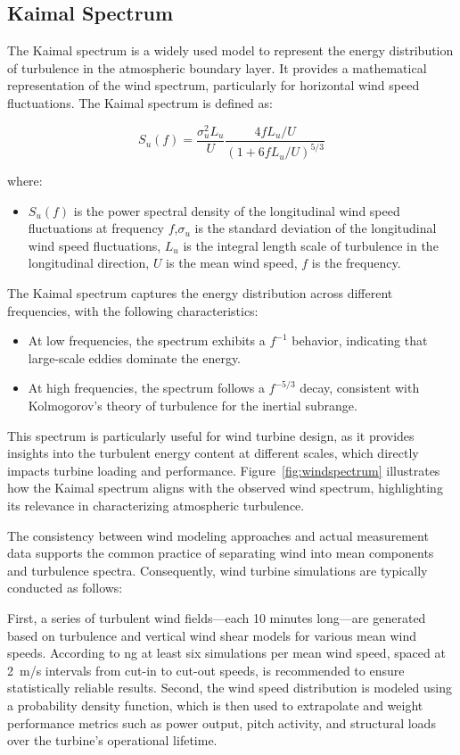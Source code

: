 \subsection{Kaimal Spectrum}
The Kaimal spectrum is a widely used model to represent the energy distribution of turbulence in the atmospheric boundary layer. It provides a mathematical representation of the wind spectrum, particularly for horizontal wind speed fluctuations. The Kaimal spectrum is defined as:

\begin{equation}
S_u(f) = \frac{\sigma_u^2 L_u}{U} \frac{4fL_u/U}{\left(1 + 6fL_u/U\right)^{5/3}}
\end{equation}

where:
\begin{itemize}
    \item $S_u(f)$ is the power spectral density of the longitudinal wind speed fluctuations at frequency $f$,$\sigma_u$ is the standard deviation of the longitudinal wind speed fluctuations, $L_u$ is the integral length scale of turbulence in the longitudinal direction, $U$ is the mean wind speed, $f$ is the frequency.
\end{itemize}

The Kaimal spectrum captures the energy distribution across different frequencies, with the following characteristics:
\begin{itemize}
    \item At low frequencies, the spectrum exhibits a $f^{-1}$ behavior, indicating that large-scale eddies dominate the energy.
    \item At high frequencies, the spectrum follows a $f^{-5/3}$ decay, consistent with Kolmogorov's theory of turbulence for the inertial subrange.
\end{itemize}

This spectrum is particularly useful for wind turbine design, as it provides insights into the turbulent energy content at different scales, which directly impacts turbine loading and performance. Figure~\ref{fig:windspectrum} illustrates how the Kaimal spectrum aligns with the observed wind spectrum, highlighting its relevance in characterizing atmospheric turbulence.

The consistency between wind modeling approaches and actual measurement data supports the common practice of separating wind into mean components and turbulence spectra. Consequently, wind turbine simulations are typically conducted as follows: 

First, a series of turbulent wind fields—each 10 minutes long—are generated based on turbulence and vertical wind shear models for various mean wind speeds. According to \cite{iec61400}ng at least six simulations per mean wind speed, spaced at 2~m/s intervals from cut-in to cut-out speeds, is recommended to ensure statistically reliable results. Second, the wind speed distribution is modeled using a probability density function, which is then used to extrapolate and weight performance metrics such as power output, pitch activity, and structural loads over the turbine's operational lifetime.


